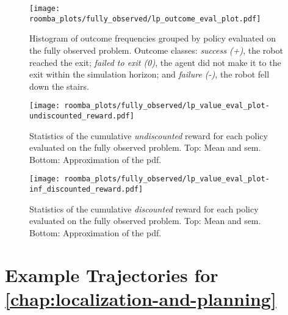 \begin{appendix}
\begin{figure}[htpb]
  \centering
  \texttt{[image: roomba\_plots/fully\_observed/lp\_outcome\_eval\_plot.pdf]}
\caption{Histogram of outcome frequencies grouped by policy evaluated on the
         fully observed problem. Outcome classes: \emph{success (+)}, the robot
         reached the exit; \emph{failed to exit (0)}, the agent did not make it to the
         exit within the simulation horizon; and \emph{failure (-)}, the robot fell
         down the stairs.}
	\label{fig:lp_outcome_fo}
\end{figure}

\begin{figure}[htpb]
  \centering
  \texttt{[image: roomba\_plots/fully\_observed/lp\_value\_eval\_plot-undiscounted\_reward.pdf]}
  \caption{Statistics of the cumulative \emph{undiscounted} reward for each
           policy evaluated on the fully observed problem. Top: Mean and \acf{sem}.
           Bottom: Approximation of the \acf{pdf}.}
  \label{fig:lp_eval_undiscounted_fo}
\end{figure}

\begin{figure}[htpb]
  \centering
  \texttt{[image: roomba\_plots/fully\_observed/lp\_value\_eval\_plot-inf\_discounted\_reward.pdf]}
  \caption{Statistics of the cumulative \emph{discounted} reward for each
           policy evaluated on the fully observed problem. Top: Mean and \acf{sem}.
           Bottom: Approximation of the \acf{pdf}.}
  \label{fig:lp_eval_infdiscounted_fo}
\end{figure}

\clearpage

\section{Example Trajectories for \cref{chap:localization-and-planning}}\label{apx:lp-example-trajectories}


\end{appendix}
